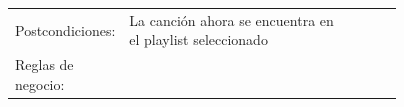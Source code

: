 \documentclass[12pt]{article}
\begin{document}
\begin{table}[H]
\begin{tabular}{|l|p{0.77\linewidth}|lll}
Postcondiciones:     & La canción ahora se encuentra en el playlist seleccionado                                                                                                                                                                                                                                                                                                        &  &  &  \\ \cline{1-2}
Reglas de negocio:   &                                                                                                                                                                                                                                                                                                                                                                  &  &  &  \\ \cline{1-2}
\end{tabular}
\end{table}
\end{document}
